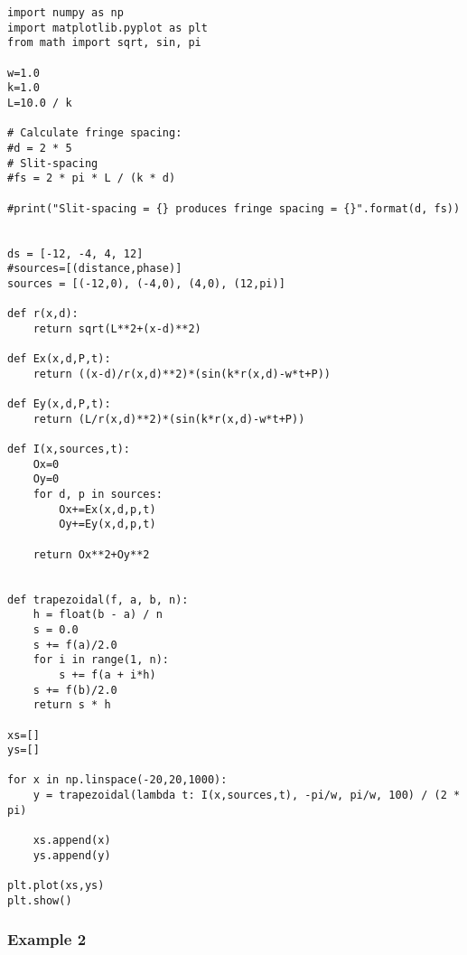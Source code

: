 \begin{Verbatim}[fontsize=\small,baselinestretch=0.9]
import numpy as np
import matplotlib.pyplot as plt
from math import sqrt, sin, pi

w=1.0
k=1.0
L=10.0 / k

# Calculate fringe spacing:
#d = 2 * 5           
# Slit-spacing
#fs = 2 * pi * L / (k * d)

#print("Slit-spacing = {} produces fringe spacing = {}".format(d, fs))


ds = [-12, -4, 4, 12]
#sources=[(distance,phase)]
sources = [(-12,0), (-4,0), (4,0), (12,pi)]

def r(x,d):
    return sqrt(L**2+(x-d)**2)
    
def Ex(x,d,P,t):
    return ((x-d)/r(x,d)**2)*(sin(k*r(x,d)-w*t+P))
   
def Ey(x,d,P,t):
    return (L/r(x,d)**2)*(sin(k*r(x,d)-w*t+P))
       
def I(x,sources,t):
    Ox=0
    Oy=0
    for d, p in sources:
        Ox+=Ex(x,d,p,t)
        Oy+=Ey(x,d,p,t)
    
    return Ox**2+Oy**2
        
    
def trapezoidal(f, a, b, n):
    h = float(b - a) / n
    s = 0.0
    s += f(a)/2.0
    for i in range(1, n):
        s += f(a + i*h)
    s += f(b)/2.0
    return s * h

xs=[]
ys=[]

for x in np.linspace(-20,20,1000):
    y = trapezoidal(lambda t: I(x,sources,t), -pi/w, pi/w, 100) / (2 * pi)
   
    xs.append(x)
    ys.append(y)

plt.plot(xs,ys)
plt.show()   
\end{Verbatim}


\subsubsection{Example 2}\label{code:phase_left}

